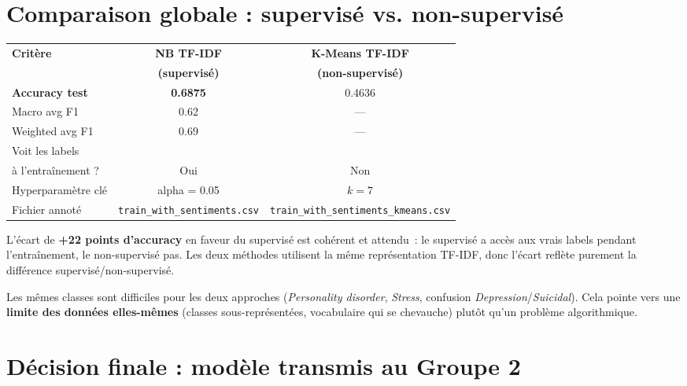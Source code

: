\documentclass[12pt,a4paper]{article}
\begin{document}
\section{Comparaison globale : supervisé vs. non-supervisé}

\begin{center}
\renewcommand{\arraystretch}{1.2}
\begin{tabular}{lcc}
\toprule
\textbf{Critère} & \textbf{NB TF-IDF } & \textbf{K-Means TF-IDF} \\
                 & \textbf{(supervisé)} & \textbf{(non-supervisé)} \\
\midrule
\textbf{Accuracy test}          & \textbf{0.6875} & 0.4636 \\
Macro avg F1                    & 0.62            & ---    \\
Weighted avg F1                 & 0.69            & ---    \\
Voit les labels                 &                 &    \\
à l'entraînement ?              & Oui             & Non    \\
Hyperparamètre clé              & alpha = 0.05    & $k = 7$ \\
Fichier annoté                  & \texttt{train\_with\_sentiments.csv} & \texttt{train\_with\_sentiments\_kmeans.csv} \\
\bottomrule
\end{tabular}
\end{center}

L'écart de \textbf{+22 points d'accuracy} en faveur du supervisé est cohérent et attendu~: le supervisé a accès aux vrais labels pendant l'entraînement, le non-supervisé pas. Les deux méthodes utilisent la même représentation TF-IDF, donc l'écart reflète purement la différence supervisé/non-supervisé.

Les mêmes classes sont difficiles pour les deux approches (\textit{Personality disorder}, \textit{Stress}, confusion \textit{Depression}/\textit{Suicidal}). Cela pointe vers une \textbf{limite des données elles-mêmes} (classes sous-représentées, vocabulaire qui se chevauche) plutôt qu'un problème algorithmique.

\pagebreak

\section{Décision finale : modèle transmis au Groupe 2}
\end{document}
